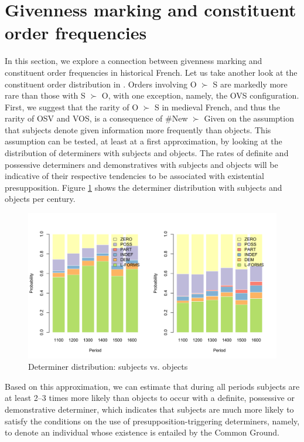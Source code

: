 \documentclass[output=paper,modfonts,nonflat]{langsci/langscibook}
\begin{document}
\section{Givenness marking and constituent order frequencies}
\label{section:orders}

In this section, we explore a connection between givenness marking and constituent order frequencies in historical French. Let us take another look at the constituent order distribution in . Orders involving O $\succ$ S are markedly more rare than those with S $\succ$ O, with one exception, namely, the OVS configuration. First, we suggest that the rarity of O $\succ$ S in medieval French, and thus the rarity of OSV and VOS, is a consequence of \#New $\succ$ Given on the assumption that subjects denote given information more frequently than objects. This assumption can be tested, at least at a first approximation, by looking at the distribution of determiners with subjects and objects. The rates of definite and possessive determiners and demonstratives with subjects and objects will be indicative of their respective tendencies to be associated with existential presupposition. Figure \ref{figure:determiners} shows the determiner distribution with subjects and objects per century.

\begin{figure}
\includegraphics[scale = 0.45]{figures/determiners.pdf}
\caption{Determiner distribution: subjects vs. objects}\label{figure:determiners}
\end{figure}

Based on this approximation, we can estimate that during all periods subjects are at least 2--3 times more likely than objects to occur with a definite, possessive or demonstrative determiner, which indicates that subjects are much more likely to satisfy the conditions on the use of presupposition-triggering determiners, namely, to denote an individual whose existence is entailed by the Common Ground. 
\end{document}
